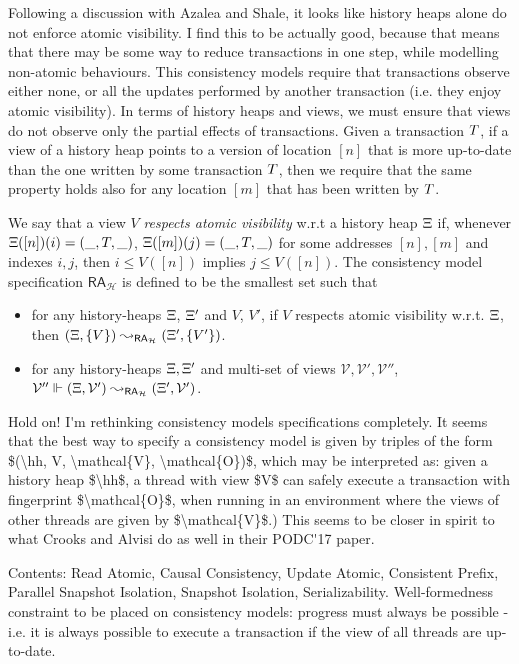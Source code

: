 \ac{Following a discussion with Azalea and Shale, it looks like history heaps alone do not enforce 
atomic visibility. I find this to be actually good, because that means that there may be some way to 
reduce transactions in one step, while modelling non-atomic behaviours}.
This consistency models require that transactions observe either none, or all the updates performed by 
another transaction (i.e. they enjoy atomic visibility). 
In terms of history heaps and views, we must ensure that views do not observe only the partial 
effects of transactions. Given a transaction $T$, if a view of a history heap points to a version of location $[n]$ that 
is more up-to-date than the one written by some transaction $T$, then we require that the 
same property holds also for any location $[m]$ that has been written by $T$.


\begin{definition}
We say that a view $V$ \emph{respects atomic visibility} w.r.t a history heap $\hh$ if, 
whenever $\Xi([n])(i) = (\_, T, \_)$, $\Xi([m])(j) = (\_, T, \_)$ for some addresses 
$[n], [m]$ and indexes $i, j$,  then $i \leq V([n])$ implies $j \leq V([n])$.
The consistency model specification $\mathsf{RA}_{\mathcal{H}}$ is defined to be the smallest set 
such that 
\begin{itemize}
\item for any history-heaps $\hh$, $\Xi'$ and  $V$, $V'$, if $V$ respects atomic visibility w.r.t. 
$\hh$, then $(\Xi, \{V\}) \leadsto_{\mathsf{RA}_{\mathcal{H}}} (\Xi', \{V'\})$.
\item for any history-heaps $\Xi,\Xi'$ and  multi-set of views $\mathcal{V}, \mathcal{V}', 
\mathcal{V}''$, $\mathcal{V}'' \Vdash (\Xi, \mathcal{V}') \leadsto_{\mathsf{RA}_{\mathcal{H}}} 
(\Xi', \mathcal{V}')$.  
\end{itemize}
\ac{Hold on! I'm rethinking consistency models specifications completely. It seems that 
the best way to specify a consistency model is given by triples of the form 
$(\hh, V, \mathcal{V}, \mathcal{O})$, which may be interpreted as: 
given a history heap $\hh$, a thread with view $V$ can safely execute a transaction 
with fingerprint $\mathcal{O}$, when running in an environment where the views 
of other threads are given by $\mathcal{V}$.) This seems to be closer in spirit 
to what Crooks and Alvisi do as well in their PODC'17 paper.}

\end{definition}

\ac{Contents: Read Atomic, Causal Consistency, Update Atomic, Consistent Prefix, Parallel Snapshot Isolation, Snapshot Isolation, 
Serializability. Well-formedness constraint to be placed on consistency models: progress must always be possible - i.e. it is 
always possible to execute a transaction if the view of all threads are up-to-date.}  